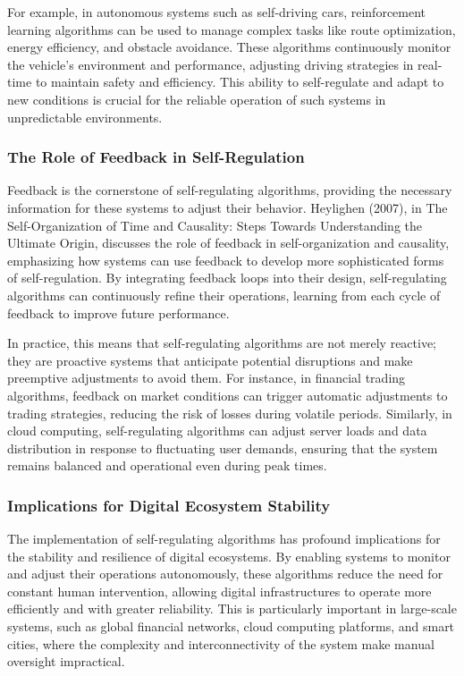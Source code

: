 \documentclass[12pt,twoside]{article}
\begin{document}
For example, in autonomous systems such as self-driving cars, reinforcement learning algorithms can be used to manage complex tasks like route optimization, energy efficiency, and obstacle avoidance. These algorithms continuously monitor the vehicle’s environment and performance, adjusting driving strategies in real-time to maintain safety and efficiency. This ability to self-regulate and adapt to new conditions is crucial for the reliable operation of such systems in unpredictable environments.

\subsubsection{The Role of Feedback in Self-Regulation}

Feedback is the cornerstone of self-regulating algorithms, providing the necessary information for these systems to adjust their behavior. Heylighen (2007), in The Self-Organization of Time and Causality: Steps Towards Understanding the Ultimate Origin, discusses the role of feedback in self-organization and causality, emphasizing how systems can use feedback to develop more sophisticated forms of self-regulation. By integrating feedback loops into their design, self-regulating algorithms can continuously refine their operations, learning from each cycle of feedback to improve future performance.

In practice, this means that self-regulating algorithms are not merely reactive; they are proactive systems that anticipate potential disruptions and make preemptive adjustments to avoid them. For instance, in financial trading algorithms, feedback on market conditions can trigger automatic adjustments to trading strategies, reducing the risk of losses during volatile periods. Similarly, in cloud computing, self-regulating algorithms can adjust server loads and data distribution in response to fluctuating user demands, ensuring that the system remains balanced and operational even during peak times.

\subsubsection{Implications for Digital Ecosystem Stability}

The implementation of self-regulating algorithms has profound implications for the stability and resilience of digital ecosystems. By enabling systems to monitor and adjust their operations autonomously, these algorithms reduce the need for constant human intervention, allowing digital infrastructures to operate more efficiently and with greater reliability. This is particularly important in large-scale systems, such as global financial networks, cloud computing platforms, and smart cities, where the complexity and interconnectivity of the system make manual oversight impractical.
\end{document}
